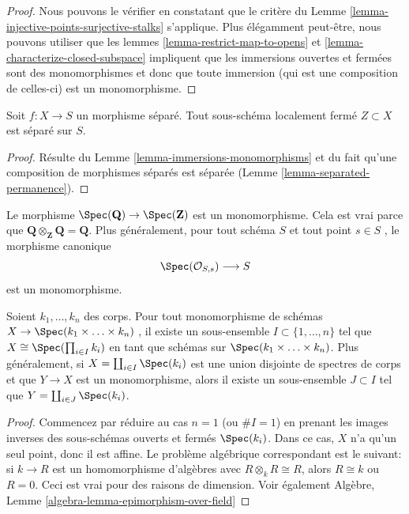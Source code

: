 \begin{proof}
Nous pouvons le vérifier en constatant que le critère du Lemme  \ref{lemma-injective-points-surjective-stalks} 
s'applique. Plus élégamment peut-être, nous pouvons utiliser que les lemmes
 \ref{lemma-restrict-map-to-opens}  et  \ref{lemma-characterize-closed-subspace}  impliquent que les immersions ouvertes et fermées
sont des monomorphismes et donc que toute immersion (qui est une composition de
celles-ci) est un monomorphisme.
\end{proof}

\begin{lemma}
\label{lemma-subscheme-of-separated-scheme}
Soit  $f : X \to S$  un morphisme séparé. Tout sous-schéma localement fermé
 $Z \subset X$  est séparé sur  $S$.
\end{lemma}

\begin{proof}
Résulte du Lemme  \ref{lemma-immersions-monomorphisms}  et du fait qu'une composition de morphismes séparés
est séparée (Lemme  \ref{lemma-separated-permanence}).
\end{proof}

\begin{example}
\label{example-Q-over-Z}
Le morphisme  $\Spec(\mathbf{Q}) \to \Spec(\mathbf{Z})$  est un monomorphisme. Cela est vrai parce que
 $\mathbf{Q} \otimes_{\mathbf{Z}} \mathbf{Q} = \mathbf{Q}$. Plus généralement, pour tout schéma  $S$  et tout point
 $s \in S$ , le morphisme canonique
$$
\Spec(\mathcal{O}_{S, s}) \longrightarrow S
$$
est un monomorphisme.
\end{example}

\begin{lemma}
\label{lemma-mono-towards-spec-field}
Soient  $k_1, \ldots, k_n$  des corps. Pour tout monomorphisme de schémas  $X \to \Spec(k_1 \times \ldots \times k_n)$ , il
existe un sous-ensemble  $I \subset \{1, \ldots, n\}$  tel que  $X \cong \Spec(\prod_{i \in I} k_i)$  en tant que schémas sur
 $\Spec(k_1 \times \ldots \times k_n)$. Plus généralement, si  $X = \coprod_{i \in I} \Spec(k_i)$  est une union disjointe de
spectres de corps et que  $Y \to X$  est un monomorphisme, alors il existe un
sous-ensemble  $J \subset I$  tel que  $Y = \coprod_{i \in J} \Spec(k_i)$.
\end{lemma}

\begin{proof}
Commencez par réduire au cas  $n = 1$  (ou  $\# I = 1$) en prenant les images
inverses des sous-schémas ouverts et fermés  $\Spec(k_i)$. Dans ce cas,
 $X$  n'a qu'un seul point, donc il est affine. Le problème algébrique
correspondant est le suivant: si  $k \to R$  est un homomorphisme d'algèbres avec
 $R \otimes_k R \cong R$, alors  $R \cong k$  ou  $R = 0$. Ceci est vrai pour des raisons
de dimension. Voir également Algèbre, Lemme  \ref{algebra-lemma-epimorphism-over-field}
\end{proof}










